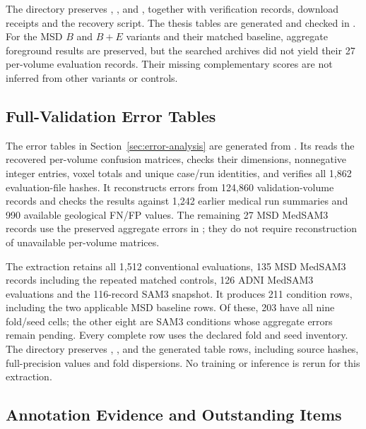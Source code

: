 \documentclass[12pt,a4paper]{article}
\begin{document}
The directory preserves ,
, 
and , together with verification
records, download receipts and the recovery script. The thesis tables
are generated and checked in
.
For the MSD $B$ and $B+E$ variants and their matched baseline,
aggregate foreground results are preserved, but the searched archives
did not yield their 27 per-volume evaluation records. Their missing
complementary scores are not inferred from other variants or controls.

\subsection{Full-Validation Error Tables}
\label{sec:all-variant-error-evidence}

The error tables in Section~\ref{sec:error-analysis} are generated from
. Its 
reads the recovered per-volume confusion matrices, checks their dimensions,
nonnegative integer entries, voxel totals and unique case/run identities,
and verifies all 1,862 evaluation-file hashes. It reconstructs errors
from 124,860 validation-volume records and checks the results against
1,242 earlier medical run summaries and 990 available geological FN/FP
values. The remaining 27 MSD MedSAM3 records use the preserved aggregate
errors in ; they
do not require reconstruction of unavailable per-volume matrices.

The extraction retains all 1,512 conventional evaluations, 135 MSD
MedSAM3 records including the repeated matched controls, 126 ADNI
MedSAM3 evaluations and the 116-record SAM3 snapshot. It produces
211 condition rows, including the two applicable MSD baseline rows.
Of these, 203 have all nine fold/seed cells; the other eight are SAM3
conditions whose aggregate errors remain pending. Every complete row
uses the declared fold and seed inventory. The directory preserves
, ,
 and the generated table rows, including source
hashes, full-precision values and fold dispersions. No training or
inference is rerun for this extraction.

\subsection{Annotation Evidence and Outstanding Items}
\end{document}
